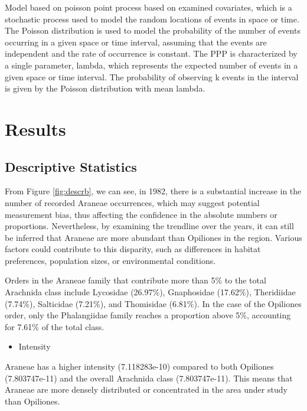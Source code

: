 \documentclass{article}
\providecommand{\tightlist}{%
  \setlength{\itemsep}{0pt}\setlength{\parskip}{0pt}}
\begin{document}
Model based on poisson point process based on examined covariates, which
is a stochastic process used to model the random locations of events in
space or time. The Poisson distribution is used to model the probability
of the number of events occurring in a given space or time interval,
assuming that the events are independent and the rate of occurrence is
constant. The PPP is characterized by a single parameter, lambda, which
represents the expected number of events in a given space or time
interval. The probability of observing k events in the interval is given
by the Poisson distribution with mean lambda.

\hypertarget{results}{%
\section*{Results}\label{results}}

\hypertarget{descriptive-statistics}{%
\subsection*{Descriptive Statistics}\label{descriptive-statistics}}

From Figure \ref{fig:descrb}, we can see, in 1982, there is a
substantial increase in the number of recorded Araneae occurrences,
which may suggest potential measurement bias, thus affecting the
confidence in the absolute numbers or proportions. Nevertheless, by
examining the trendline over the years, it can still be inferred that
Araneae are more abundant than Opiliones in the region. Various factors
could contribute to this disparity, such as differences in habitat
preferences, population sizes, or environmental conditions.

Orders in the Araneae family that contribute more than 5\% to the total
Arachnida class include Lycosidae (26.97\%), Gnaphosidae (17.62\%),
Theridiidae (7.74\%), Salticidae (7.21\%), and Thomisidae (6.81\%). In
the case of the Opiliones order, only the Phalangiidae family reaches a
proportion above 5\%, accounting for 7.61\% of the total class.

\begin{itemize}
\tightlist
\item
  Intensity
\end{itemize}

Araneae has a higher intensity (7.118283e-10) compared to both Opiliones
(7.803747e-11) and the overall Arachnida class (7.803747e-11). This
means that Araneae are more densely distributed or concentrated in the
area under study than Opiliones.
\end{document}
